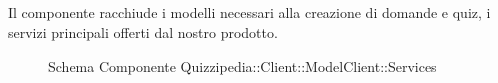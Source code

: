 \subsection{}
Il componente racchiude i modelli necessari alla creazione di domande e quiz, i servizi principali offerti dal nostro prodotto.
\begin{figure}[H]
\centering
\noindent{}
\caption[Schema Componente Quizzipedia::Client::ModelClient::Services]{Schema Componente Quizzipedia::Client::ModelClient::Services}
\end{figure}

